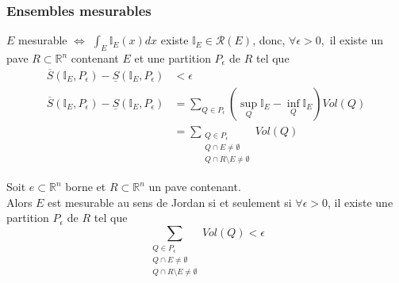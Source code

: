 \documentclass[../main.tex]{subfiles}
\begin{document}
\subsubsection*{Ensembles mesurables}

$E$ mesurable $\iff $ $\int_E \mathbb{I}_E ( x) dx $ existe $ \mathbb{I}_E \in \mathcal{R}( E) $, donc, $\forall \epsilon>0,$ il existe un pave $R \subset \mathbb{R}^n$ contenant $E$ et une partition $P_\epsilon$ de $R$ tel que
\begin{align*}
	\overline{S}( \mathbb{I}_E, P_\epsilon) - \underline { S}  ( \mathbb{I}_E, P_\epsilon) &<\epsilon\\
\overline{S}( \mathbb{I}_E, P_\epsilon) - \underline { S}  ( \mathbb{I}_E, P_\epsilon) &= \sum_{Q \in P_\epsilon} ( \sup_Q \mathbb{I}_E- \inf_Q \mathbb{I}_E) Vol( Q) \\
										       &= \sum_{ \substack { Q \in P_\epsilon\\ Q \cap E \neq \emptyset \\ Q \cap R\setminus E \neq \emptyset} } Vol( Q)
\end{align*}
\begin{lemma}
Soit $e \subset \mathbb{R}^n$ borne et $R \subset \mathbb{R}^n$ un pave contenant.\\
Alors $E$ est mesurable au sens de Jordan si et seulement si $\forall \epsilon>0$, il existe une partition $P_\epsilon$ de  $R$ tel que
\[ 
	\sum_{ \substack { Q \in P_\epsilon\\ Q \cap E \neq \emptyset \\ Q \cap R\setminus E \neq \emptyset} } Vol( Q) < \epsilon
\]

\end{lemma}
\end{document}
